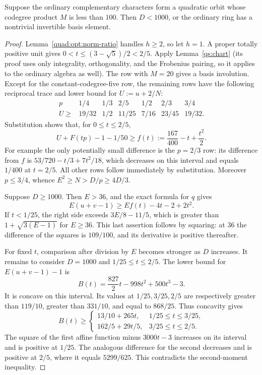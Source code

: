\begin{lemma}\label{quad:opt:short-quadratic}
Suppose the ordinary complementary characters form a quadratic orbit
whose codegree product $M$ is less than $100$. Then $D<1000$, or the
ordinary ring has a nontrivial invertible basis element.
\end{lemma}
\begin{proof}
Lemma~\ref{quad:opt:norm-ratio} handles $h\ge2$, so let $h=1$. A proper totally
positive unit gives $0<t\le(3-\sqrt5)/2<2/5$.
Apply Lemma~\ref{qs:chart} (its proof uses only
integrality, orthogonality, and the Frobenius pairing, so it applies to
the ordinary algebra as well). The row with $M=20$ gives a basis
involution. Except for the constant-codegree-five row, the remaining
rows have the following reciprocal trace and lower bound for
$U:=u+2/N$:
\[
\begin{array}{c|rrrrrr}
 p&1/4&1/3&2/5&1/2&2/3&3/4\\\hline
 U\ge&19/32&1/2&11/25&7/16&23/45&19/32.
\end{array}
\]
Substitution shows that, for $0\le t\le2/5$,
\[
 U+F(tp)-1-1/50\ge f(t):=\frac{167}{400}-t+\frac{t^2}{2}.
\]
For example the only potentially small difference is the $p=2/3$
row: its difference from $f$ is
$53/720-t/3+7t^2/18$, which decreases on this interval and equals
$1/400$ at $t=2/5$. All other rows follow immediately by substitution.
Moreover $p\le3/4$, whence $E^2\ge N>D/p\ge4D/3$.

Suppose $D\ge1000$. Then $E>36$, and the exact formula for $q$ gives
\[
 E(u+v-1)\ge Ef(t)-4t-2+2t^2.
\]
If $t<1/25$, the right side exceeds $3E/8-11/5$, which is greater
than $1+\sqrt{3(E-1)}$ for $E\ge36$. This last assertion follows by
squaring: at $36$ the difference of the squares is $109/100$, and its
derivative is positive thereafter.

For fixed $t$, comparison after division by $E$ becomes stronger as
$D$ increases. It remains to consider $D=1000$ and
$1/25\le t\le2/5$. The lower bound for $E(u+v-1)-1$ is
\[
 B(t)=\frac{827}{2}t-998t^2+500t^3-3.
\]
It is concave on this interval. Its values at $1/25,3/25,2/5$ are
respectively greater than $119/10$, greater than $331/10$, and equal
to $868/25$. Thus concavity gives
\[
 B(t)\ge
 \begin{cases}
 13/10+265t,&1/25\le t\le3/25,\\
 162/5+29t/5,&3/25\le t\le2/5.
 \end{cases}
\]
The square of the first affine function minus $3000t-3$ increases
on its interval and is positive at $1/25$. The analogous difference
for the second decreases and is positive at $2/5$, where it equals
$5299/625$. This contradicts the second-moment inequality.


\end{proof}
